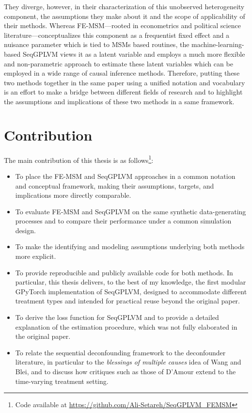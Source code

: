 They diverge, however, in their characterization of this 
unobserved heterogeneity component, the assumptions they make about it and the scope of 
applicability of their methods. 
Whereas FE-MSM—rooted in econometrics and political science literature—conceptualizes this 
component as a frequentist fixed effect and a nuisance parameter which is tied 
to MSMs based routines, 
the machine-learning-based SeqGPLVM views it 
as a latent variable and employs a much more flexible and non-parametric 
approach to estimate these latent variables which can be employed in a wide range of 
causal inference methods. 
Therefore, putting these two methods 
together in the same paper using a unified notation and vocabulary is an effort to make a 
bridge between different fields of research and to highlight the 
assumptions and implications of these two methods in a same framework. 



\section{Contribution}
The main contribution of this thesis is as follows\footnote{Code available at \url{https://github.com/Ali-Setareh/SeqGPLVM_FEMSM}}:
\begin{itemize}
    \item To place the FE-MSM and SeqGPLVM approaches in a common notation and conceptual framework, making their assumptions, targets, and implications more directly comparable.
    \item To evaluate FE-MSM and SeqGPLVM on the same synthetic data-generating processes and to compare their performance under a common simulation design.
    \item To make the identifying and modeling assumptions underlying both methods more explicit.
    \item To provide reproducible and publicly available code for both methods. In particular, this thesis delivers, to the best of my knowledge, the first modular GPyTorch implementation of SeqGPLVM, designed to accommodate different treatment types and intended for practical reuse beyond the original paper.
    \item To derive the loss function for SeqGPLVM and to provide a detailed explanation of the estimation procedure, which was not fully elaborated in the original paper.
    \item To relate the sequential deconfounding framework to the deconfounder literature, in particular to the \emph{blessings of multiple causes} idea of Wang and Blei, and to discuss how critiques such as those of D'Amour extend to the time-varying treatment setting.
\end{itemize}

